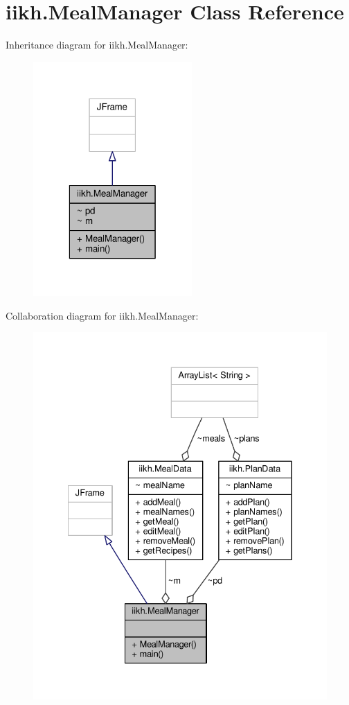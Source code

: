\hypertarget{classiikh_1_1MealManager}{\section{iikh.\-Meal\-Manager Class Reference}
\label{classiikh_1_1MealManager}
}


Inheritance diagram for iikh.\-Meal\-Manager\-:
\nopagebreak
\begin{figure}[H]
\begin{center}
\leavevmode
\includegraphics[width=172pt]{classiikh_1_1MealManager__inherit__graph}
\end{center}
\end{figure}


Collaboration diagram for iikh.\-Meal\-Manager\-:
\nopagebreak
\begin{figure}[H]
\begin{center}
\leavevmode
\includegraphics[width=335pt]{classiikh_1_1MealManager__coll__graph}
\end{center}
\end{figure}
